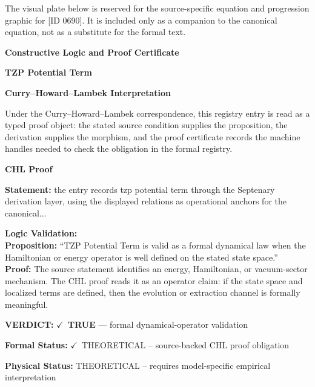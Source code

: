 \begingroup\footnotesize\sloppy
The visual plate below is reserved for the source-specific equation and progression graphic for [ID 0690]. It is included only as a companion to the canonical equation, not as a substitute for the formal text.
\par\endgroup
\ifTZPDarkEdition
{}
\fi

\clearpage
\begingroup\tzpsupportsetup
\noindent\textbf{\fontsize{10.8pt}{12.8pt}\selectfont [ID 0690] Constructive Logic and Proof Certificate}\par
\noindent\textbf{\fontsize{10pt}{12pt}\selectfont TZP Potential Term}\par
\vspace{0.45em}
\begingroup
\footnotesize
\setlength{\parskip}{0.22em}
\setlength{\parindent}{0pt}
\noindent\textbf{Curry--Howard--Lambek Interpretation}\par
Under the Curry--Howard--Lambek correspondence, this registry entry is read as a typed proof
object: the stated source condition supplies the proposition, the derivation supplies the
morphism, and the proof certificate records the machine handles needed to check the obligation
in the formal registry.

\vspace{0.45em}
\noindent\textbf{CHL Proof}\par
\textbf{Statement:} the entry records tzp potential term through the Septenary derivation layer, using the
displayed relations as operational anchors for the canonical...

\textbf{Logic Validation:}\\
\textbf{Proposition:} ``TZP Potential Term is valid as a formal dynamical law when the Hamiltonian or energy
operator is well defined on the stated state space.''\\
\textbf{Proof:} The source statement identifies an energy, Hamiltonian, or vacuum-sector mechanism. The
CHL proof reads it as an operator claim: if the state space and localized terms are
defined, then the evolution or extraction channel is formally meaningful.

\textbf{VERDICT:} \ensuremath{\checkmark}\ \textbf{TRUE} --- formal dynamical-operator validation

\textbf{Formal Status:} \ensuremath{\checkmark}\ THEORETICAL -- source-backed CHL proof obligation

\textbf{Physical Status:} THEORETICAL -- requires model-specific empirical interpretation
\par\vspace{0.45em}
\par
\ifTZPDarkEdition
{}
\fi
\endgroup
\endgroup
